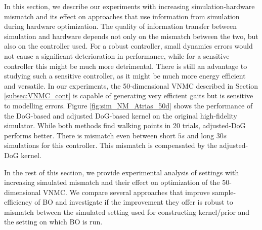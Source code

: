 In this section, we describe our experiments with increasing simulation-hardware mismatch and its effect on approaches that use information from simulation during hardware optimization. The quality of information transfer between simulation and hardware depends not only on the mismatch between the two, but also on the controller used. For a robust controller, small dynamics errors would not cause a significant deterioration in performance, while for a sensitive controller this might be much more detrimental. There is still an advantage to studying such a sensitive controller, as it might be much more energy efficient and versatile. In our experiments, the 50-dimensional VNMC described in Section \ref{subsec:VNMC_cont} is capable of generating very efficient gaits but is sensitive to modelling errors. Figure \ref{fig:sim_NM_Atrias_50d} shows the performance of the DoG-based and adjusted DoG-based kernel on the original high-fidelity simulator. While both methods find walking points in 20 trials, adjusted-DoG performs better. There is mismatch even between short $5s$ and long $30s$ simulations for this controller. This mismatch is compensated by the adjusted-DoG kernel.


In the rest of this section, we provide experimental analysis of settings with increasing simulated mismatch and their effect on optimization of the 50-dimensional VNMC. We compare several approaches that improve sample-efficiency of BO and investigate if the improvement they offer is robust to mismatch between the simulated setting used for constructing kernel/prior and the setting on which BO is run. 

